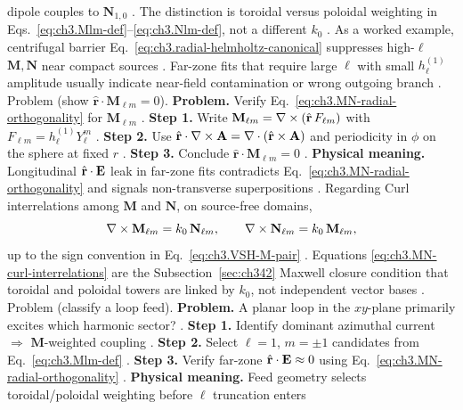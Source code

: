 dipole couples to \(\mathbf{N}_{1,0}\) \cite{jackson1999}. The distinction is toroidal versus
poloidal weighting in Eqs.~\eqref{eq:ch3.Mlm-def}--\eqref{eq:ch3.Nlm-def}, not a different \(k_{0}\)
\cite{stratton1941}.
As a worked example, centrifugal barrier Eq.~\eqref{eq:ch3.radial-helmholtz-canonical} suppresses high-\(\ell\) \(\mathbf{M},\mathbf{N}\)
near compact sources \cite{jackson1999}. Far-zone fits that require large \(\ell\) with small
\(h_{\ell}^{(1)}\) amplitude usually indicate near-field contamination or wrong outgoing branch
\cite{harrington2001}.
Problem (show \(\hat{\mathbf{r}}\cdot\mathbf{M}_{\ell m}=0\)). \textbf{Problem.} Verify Eq.~\eqref{eq:ch3.MN-radial-orthogonality} for \(\mathbf{M}_{\ell m}\)
\cite{stratton1941}.
\textbf{Step 1.} Write \(\mathbf{M}_{\ell m}=\nabla\times(\hat{\mathbf{r}}\,F_{\ell m})\) with
\(F_{\ell m}=h_{\ell}^{(1)}Y_{\ell}^{m}\) \cite{hansen1988}.
\textbf{Step 2.} Use \(\hat{\mathbf{r}}\cdot\nabla\times\mathbf{A}=\nabla\cdot(\hat{\mathbf{r}}\times\mathbf{A})\) and
periodicity in \(\phi\) on the sphere at fixed \(r\) \cite{jackson1999}.
\textbf{Step 3.} Conclude \(\hat{\mathbf{r}}\cdot\mathbf{M}_{\ell m}=0\) \cite{tai1994}.
\textbf{Physical meaning.} Longitudinal \(\hat{\mathbf{r}}\cdot\mathbf{E}\) leak in far-zone fits contradicts
Eq.~\eqref{eq:ch3.MN-radial-orthogonality} and signals non-transverse superpositions \cite{harrington2001}.
Regarding Curl interrelations among \(\mathbf{M}\) and \(\mathbf{N}\), on source-free domains,
\begin{equation}
\label{eq:ch3.MN-curl-interrelations}
\nabla\times\mathbf{M}_{\ell m}
=
k_{0}\,\mathbf{N}_{\ell m},
\qquad
\nabla\times\mathbf{N}_{\ell m}
=
k_{0}\,\mathbf{M}_{\ell m},
\end{equation}
up to the sign convention in Eq.~\eqref{eq:ch3.VSH-M-pair} \cite{hansen1988}. Equations
\eqref{eq:ch3.MN-curl-interrelations} are the Subsection~\ref{sec:ch342} Maxwell closure condition that toroidal and
poloidal towers are linked by \(k_{0}\), not independent vector bases \cite{stratton1941}.
Problem (classify a loop feed). \textbf{Problem.} A planar loop in the \(xy\)-plane primarily excites which harmonic sector?
\cite{harrington2001}.
\textbf{Step 1.} Identify dominant azimuthal current \(\Rightarrow\) \(\mathbf{M}\)-weighted coupling
\cite{harrington2001}.
\textbf{Step 2.} Select \(\ell=1\), \(m=\pm1\) candidates from Eq.~\eqref{eq:ch3.Mlm-def} \cite{jackson1999}.
\textbf{Step 3.} Verify far-zone \(\hat{\mathbf{r}}\cdot\mathbf{E}\approx0\) using Eq.~\eqref{eq:ch3.MN-radial-orthogonality}
\cite{stratton1941}.
\textbf{Physical meaning.} Feed geometry selects toroidal/poloidal weighting before \(\ell\) truncation enters
